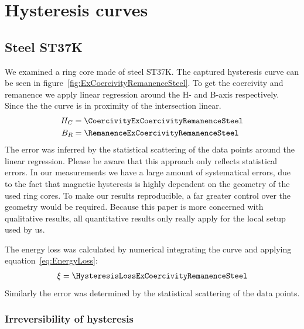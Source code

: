 \documentclass[a4paper,10pt,twocolumn]{article}
\begin{document}
    \section{Hysteresis curves}
    \subsection{Steel ST37K}
    \label{subsec:steel}
    
    
    We examined a ring core made of steel ST37K\@.
    The captured hysteresis curve can be seen in figure~\ref{fig:ExCoercivityRemanenceSteel}.
    To get the coercivity and remanence we apply linear regression around the H- and B-axis respectively.
    Since the the curve is in proximity of the intersection linear.
    \begin{align*}
        H_C &= \CoercivityExCoercivityRemanenceSteel \\
        B_R &= \RemanenceExCoercivityRemanenceSteel
    \end{align*}
    The error was inferred by the statistical scattering of the data points around the linear regression.
    Please be aware that this approach only reflects statistical errors.
    In our measurements we have a large amount of systematical errors, due to the fact that magnetic hysteresis is
    highly dependent on the geometry of the used ring cores. 
    To make our results reproducible, a far greater control over the geometry would be required.
    Because this paper is more concerned with qualitative results, all quantitative results only really apply for the
    local setup used by us.
    
    
    The energy loss was calculated by numerical integrating the curve and applying equation~\eqref{eq:EnergyLoss}:
    \begin{align*}
        \xi = \HysteresisLossExCoercivityRemanenceSteel
    \end{align*}
    Similarly the error was determined by the statistical scattering of the data points.
    
    \subsubsection*{Irreversibility of hysteresis}
    
\end{document}

